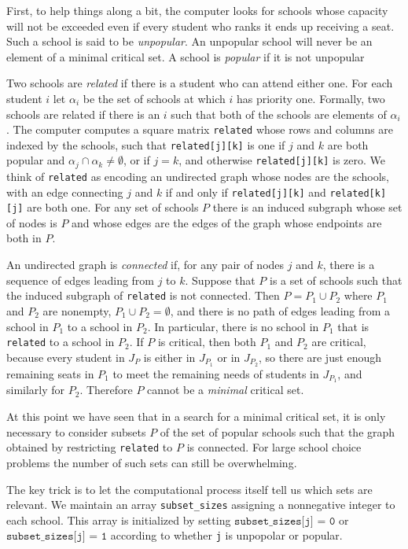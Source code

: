 \documentclass[12pt]{article}
\theoremstyle{definition}
\begin{document}
First, to help things along a bit, the computer looks for schools
whose capacity will not be exceeded even if every student who ranks it
ends up receiving a seat.  Such a school is said to be
\emph{unpopular}.  An unpopular school will never be an element of a
minimal critical set. A school is \emph{popular} if it is not
unpopular

Two schools are \emph{related} if there is a student who can attend
either one.  For each student $i$ let $\alpha_i$ be the set of schools
at which $i$ has priority one.  Formally, two schools are related if
there is an $i$ such that both of the schools are elements of
$\alpha_i$.  The computer computes a square matrix \texttt{related}
whose rows and columns are indexed by the schools, such that
\texttt{related[j][k]} is one if $j$ and $k$ are both popular and
$\alpha_j \cap \alpha_k \ne \emptyset$, or if $j = k$, and otherwise
\texttt{related[j][k]} is zero.  We think of \texttt{related} as
encoding an undirected graph whose nodes are the schools, with an edge
connecting $j$ and $k$ if and only if \texttt{related[j][k]} and
\texttt{related[k][j]} are both one.  For any set of schools $P$ there
is an induced subgraph whose set of nodes is $P$ and whose edges are
the edges of the graph whose endpoints are both in $P$.

An undirected graph is \emph{connected} if, for any pair of nodes $j$
and $k$, there is a sequence of edges leading from $j$ to $k$.
Suppose that $P$ is a set of schools such that the induced subgraph of
\texttt{related} is not connected.  Then $P = P_1 \cup P_2$ where
$P_1$ and $P_2$ are nonempty, $P_1 \cup P_2 = \emptyset$, and there is
no path of edges leading from a school in $P_1$ to a school in $P_2$.
In particular, there is no school in $P_1$ that is \texttt{related} to
a school in $P_2$.  If $P$ is critical, then both $P_1$ and $P_2$ are
critical, because every student in $J_P$ is either in $J_{P_1}$ or in
$J_{P_2}$, so there are just enough remaining seats in $P_1$ to meet
the remaining needs of students in $J_{P_1}$, and similarly for $P_2$.
Therefore $P$ cannot be a \emph{minimal} critical set.

At this point we have seen that in a search for a minimal critical
set, it is only necessary to consider subsets $P$ of the set of
popular schools such that the graph obtained by restricting
\texttt{related} to $P$ is connected.  For large school choice
problems the number of such sets can still be overwhelming.

The key trick is to let the computational process itself tell us which
sets are relevant.  We maintain an array \texttt{subset\_sizes}
assigning a nonnegative integer to each school.  This array is
initialized by setting $\texttt{subset\_sizes[j] = 0}$ or
$\texttt{subset\_sizes[j] = 1}$ according to whether \texttt{j} is
unpopolar or popular.
\end{document}
